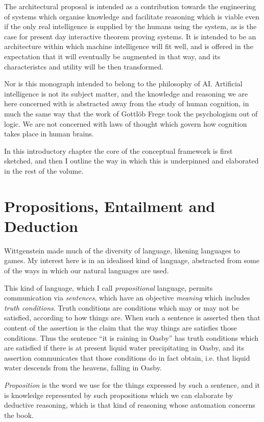 The architectural proposal is intended as a contribution towards the engineering of systems which organise knowledge and facilitate reasoning which is viable even if the only real intelligence is supplied by the humans using the system, as is the case for present day interactive theorem proving systems.
It is intended to be an architecture within which machine intelligence will fit well, and is offered in the expectation that it will eventually be augmented in that way, and its characteristcs and utility will be then transformed.

Nor is this monograph intended to belong to the philosophy of AI.
Artificial intelligence is not its subject matter, and the knowledge and reasoning we are here concerned with is abstracted away from the study of human cognition, in much the same way that the work of Gottl{\"o}b Frege took the psychologism out of logic.
We are not concerned with laws of thought which govern how cognition takes place in human brains.

In this introductory chapter the core of the conceptual framework is first sketched, and then I outline the way in which this is underpinned and elaborated in the rest of the volume.

\section{Propositions, Entailment and Deduction}

Wittgenstein made much of the diversity of language, likening languages to games.
My interest here is in an idealised kind of language, abstracted from some of the ways in which our natural languages are used.

This kind of language, which I call {\it propositional} language, permits communication via {\it sentences}, which have an objective {\it meaning} which includes {\it truth conditions}.
Truth conditions are conditions which may or may not be satisfied, according to how things are.
When such a sentence is asserted then that content of the assertion is the claim that the way things are satisfies those conditions.
Thus the sentence ``it is raining in Oasby'' has truth conditions which are satisfied if there is at present liquid water precipitating in Oasby, and its assertion communicates that those conditions do in fact obtain, i.e. that liquid water descends from the heavens, falling in Oasby.

{\it Proposition} is the word we use for the things expressed by such a sentence, and it is knowledge represented by such propositions which we can elaborate by deductive reasoning, which is that kind of reasoning whose automation concerns the book.



